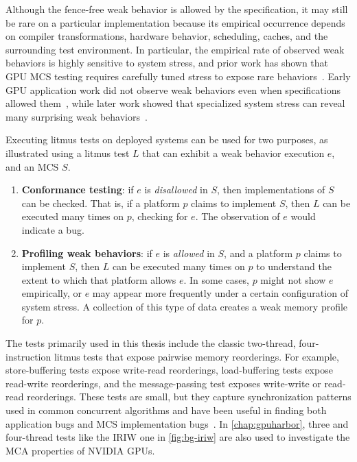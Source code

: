 Although the fence-free weak behavior is allowed by the specification, it may still be rare on a particular implementation because its empirical occurrence depends on compiler transformations, hardware behavior, scheduling, caches, and the surrounding test environment. In particular, the empirical rate of observed weak behaviors is highly sensitive to system stress, and prior work has shown that GPU MCS testing requires carefully tuned stress to expose rare behaviors~\cite{alglave2015gpu,sorensen2016exposing,kirkham2020foundations,levine2023mcmutants}. Early GPU application work did not observe weak behaviors even when specifications allowed them~\cite{feng2010synchronize}, while later work showed that specialized system stress can reveal many surprising weak behaviors~\cite{alglave2015gpu,sorensen2016exposing}.

Executing litmus tests on deployed systems can be used for two purposes, as illustrated using a litmus test $L$ that can exhibit a weak behavior execution $e$, and an MCS $S$.
\begin{enumerate}
    \item \textbf{Conformance testing}: if $e$ is \textit{disallowed} in $S$, then implementations of $S$ can be checked. That is, if a platform $p$ claims to implement $S$, then $L$ can be executed many times on $p$, checking for $e$. The observation of $e$ would indicate a bug.
    \item \textbf{Profiling weak behaviors}: if $e$ is \textit{allowed} in $S$, and a platform $p$ claims to implement $S$, then $L$ can be executed many times on $p$ to understand the extent to which that platform allows $e$. In some cases, $p$ might not show $e$ empirically, or $e$ may appear more frequently under a certain configuration of system stress. A collection of this type of data creates a weak memory profile for $p$.
\end{enumerate}

The tests primarily used in this thesis include the classic two-thread, four-instruction litmus tests that expose pairwise memory reorderings. For example, store-buffering tests expose write-read reorderings, load-buffering tests expose read-write reorderings, and the message-passing test exposes write-write or read-read reorderings. These tests are small, but they capture synchronization patterns used in common concurrent algorithms and have been useful in finding both application bugs and MCS implementation bugs~\cite{sorensen2016exposing,kirkham2020foundations}. In \mychap\ref{chap:gpuharbor}, three and four-thread tests like the IRIW one in \myfig\ref{fig:bg-iriw} are also used to investigate the MCA properties of NVIDIA GPUs.

